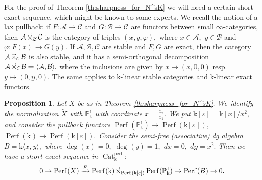 \documentclass[11pt,leqno]{amsart}
\newtheorem{prop}[theo]{Proposition}
\numberwithin{equation}{section}
\def\wt{\widetilde}
\def\PP{{\mathbb P}}
\newcommand{\laxtimes}[1]{\mathop{\times\mkern-13mu\raise1.3ex\hbox{$\scriptscriptstyle\to$}_{#1}}}
\newcommand{\xto}{\xrightarrow}
\newcommand{\Cat}{\operatorname{Cat}}
\newcommand{\mk}{\mathrm k}
\newcommand{\cA}{{\mathcal A}}
\newcommand{\cB}{{\mathcal B}}
\newcommand{\cC}{{\mathcal C}}
\newcommand{\veps}{\varepsilon}
\newcommand{\la}{\langle}
\newcommand{\ra}{\rangle}
\newcommand{\Perf}{\operatorname{Perf}}
\newcommand{\perf}{\operatorname{perf}}
\begin{document}
For the proof of Theorem \ref{th:sharpness_for_N^sK} we will need a certain short exact sequence, which might be known to some experts. We recall the notion of a lax pullback: if $F:\cA\to\cC$ and $G:\cB\to\cC$ are functors between small $\infty$-categories, then $\cA\laxtimes{\cB}\cC$ is the category of triples $(x,y,\varphi),$ where $x\in\cA,$ $y\in\cB$ and $\varphi:F(x)\to G(y).$ If $\cA,\cB,\cC$ are stable and $F, G$ are exact, then the category $\cA\laxtimes{\cC}\cB$ is also stable, and it has a semi-orthogonal decomposition $\cA\laxtimes{\cC}\cB=\la\cA,\cB\ra,$ where the inclusions are given by $x\mapsto (x,0,0)$ resp. $y\mapsto (0,y,0).$ The same applies to $\mk$-linear stable categories and $\mk$-linear exact functors. 

\begin{prop}\label{prop:ses_for_cat_res_of_cuspidal}
Let $X$ be as in Theorem \ref{th:sharpness_for_N^sK}. We identify the normalization $\wt{X}$ with $\PP^1_{\mk}$ with coordinate $x=\frac{x_2}{x_1}.$ We put $\mk[\veps]=\mk[x]/x^2,$ and consider the pullback functors $\Perf(\PP^1_{\mk})\to\Perf(\mk[\veps]),$ $\Perf(\mk)\to\Perf(\mk[\veps]).$ Consider the semi-free (associative) dg algebra $B=\mk\la x,y\ra,$ where $\deg(x)=0,$ $\deg(y)=1,$ $dx=0,$ $dy=x^2.$ Then we have a short exact sequence in $\Cat_{\mk}^{\perf}:$
\begin{equation}\label{eq:ses_cat_res_for_cuspidal}
0\to \Perf(X)\xto{F} \Perf(\mk)\laxtimes{\Perf(\mk[\veps])} \Perf(\PP^1_{\mk}) \to \Perf(B)\to 0.
\end{equation}
\end{prop}
\end{document}
